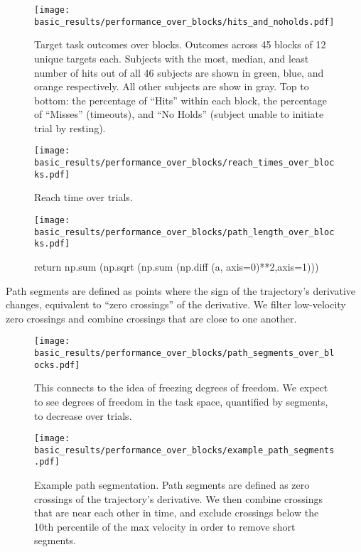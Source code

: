 \documentclass[../main.tex]{subfiles}
\begin{document}
\begin{figure}[H]%
    \centering
    \texttt{[image: basic\_results/performance\_over\_blocks/hits\_and\_noholds.pdf]}
    \caption[Hit counts over trials]{Target task outcomes over blocks. Outcomes across 45 blocks of 12 unique targets each. Subjects with the most, median, and least number of hits out of all 46 subjects are shown in green, blue, and orange respectively. All other subjects are show in gray. Top to bottom: the percentage of ``Hits'' within each block, the percentage of ``Misses'' (timeouts), and ``No Holds'' (subject unable to initiate trial by resting).}\label{fig:hits_and_noholds}
\end{figure}


\begin{figure}[H]%
    \centering
    \texttt{[image: basic\_results/performance\_over\_blocks/reach\_times\_over\_blocks.pdf]}
    \caption[Reach time over trials]{Reach time over trials.}\label{fig:reach_times_over_blocks}
\end{figure}


\begin{figure}[H]%
    \centering
    \texttt{[image: basic\_results/performance\_over\_blocks/path\_length\_over\_blocks.pdf]}
    \caption[Trajectory length over trials]{return np.sum (np.sqrt (np.sum (np.diff (a, axis=0)**2,axis=1)))}\label{fig:path_length_over_blocks}
\end{figure}


Path segments are defined as points where the sign of the trajectory's derivative changes, equivalent to ``zero crossings'' of the derivative. We filter low-velocity zero crossings and combine crossings that are close to one another. 

\begin{figure}[H]%
    \centering
    \texttt{[image: basic\_results/performance\_over\_blocks/path\_segments\_over\_blocks.pdf]}
    \caption[Trajectory segments over trials]{This connects to the idea of freezing degrees of freedom. We expect to see degrees of freedom in the task space, quantified by segments, to decrease over trials.}\label{fig:path_segments_over_blocks}
\end{figure}


\begin{figure}[H]%
    \centering
    \texttt{[image: basic\_results/performance\_over\_blocks/example\_path\_segments.pdf]}
    \caption[Example of a path segmented trial]{Example path segmentation. Path segments are defined as zero crossings of the trajectory's derivative. We then combine crossings that are near each other in time, and exclude crossings below the 10th percentile of the max velocity in order to remove short segments.}\label{fig:example_segments}
\end{figure}
\end{document}
